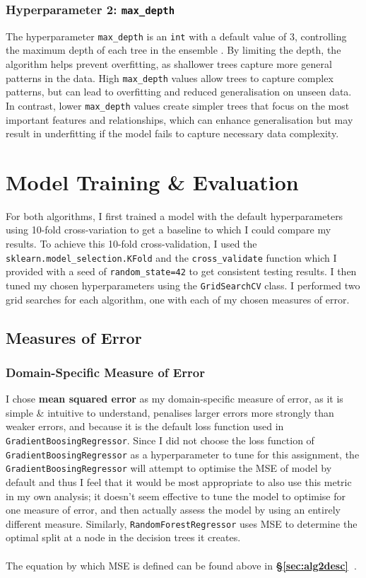 \documentclass[a4paper]{article}
\newcommand{\secref}[1]{\textbf{§\ref{#1}~\nameref{#1}}}
\begin{document}
\subsubsection{Hyperparameter 2: \texttt{max_depth}}
The hyperparameter \texttt{max_depth} is an \texttt{int} with a default value of 3, controlling the maximum depth of each tree in the ensemble \supercite{scikit_gradientboostingregressor}. 
By limiting the depth, the algorithm helps prevent overfitting, as shallower trees capture more general patterns in the data.
High \texttt{max_depth} values allow trees to capture complex patterns, but can lead to overfitting and reduced generalisation on unseen data.
In contrast, lower \texttt{max_depth} values create simpler trees that focus on the most important features and relationships, which can enhance generalisation but may result in underfitting if the model fails to capture necessary data complexity.

\section{Model Training \& Evaluation}
For both algorithms, I first trained a model with the default hyperparameters using 10-fold cross-variation to get a baseline to which I could compare my results.
To achieve this 10-fold cross-validation, I used the \texttt{sklearn.model_selection.KFold} and the \texttt{cross_validate} function which I provided with a seed of \texttt{random_state=42} to get consistent testing results.
I then tuned my chosen hyperparameters using the \texttt{GridSearchCV} class.
I performed two grid searches for each algorithm, one with each of my chosen measures of error.

\subsection{Measures of Error}
\subsubsection{Domain-Specific Measure of Error}
I chose \textbf{mean squared error} as my domain-specific measure of error, as it is simple \& intuitive to understand, penalises larger errors more strongly than weaker errors, and because it is the default loss function used in \texttt{GradientBoosingRegressor}.
Since I did not choose the loss function of \texttt{GradientBoosingRegressor} as a hyperparameter to tune for this assignment, the \texttt{GradientBoosingRegressor} will attempt to optimise the MSE of model by default and thus I feel that it would be most appropriate to also use this metric in my own analysis; it doesn't seem effective to tune the model to optimise for one measure of error, and then actually assess the model by using an entirely different measure.
Similarly, \texttt{RandomForestRegressor} uses MSE to determine the optimal split at a node in the decision trees it creates.
\\\\
The equation by which MSE is defined can be found above in \secref{sec:alg2desc}.
\end{document}
